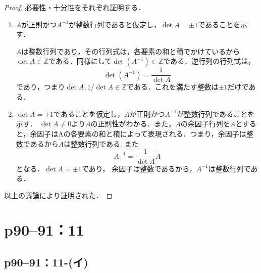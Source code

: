 \documentclass[a4paper,10pt,fleqn]{ltjsarticle}
\begin{document}
\begin{leftbar}
  \begin{proof}
    必要性・十分性をそれぞれ証明する．
    \begin{enumerate}
      \item $A$が正則かつ$A^{-1}$が整数行列であると仮定し，$\det A=\pm 1$であることを示す．

            $A$は整数行列であり，その行列式は，各要素の和と積でかけているから$\det A \in \mathbb{Z}$である．同様にして$\det (A^{-1}) \in \mathbb{Z}$である．逆行列の行列式は，
            \[
              \det (A^{-1})=\frac{1}{\det A}
            \]
            であり，つまり$\det A,1/\det A \in \mathbb{Z}$である．これを満たす整数は$\pm 1$だけである．
      \item $\det A=\pm 1$であることを仮定し，$A$が正則かつ$A^{-1}$が整数行列であることを示す．
            $\det A \neq 0$より$A$の正則性がわかる．また，$A$の余因子行列を$\tilde{A}$とすると，余因子はAの各要素の和と積によって表現される．つまり，余因子は整数であるから$\tilde{A}$は整数行列である. また
            \[
              A^{-1}=\frac{1}{\det A}\tilde{A}
            \]
            となる．$\det A=\pm 1$であり， 余因子は整数であるから，$A^{-1}$は整数行列である．
    \end{enumerate}
    以上の議論により証明された．
  \end{proof}
\end{leftbar}

\newpage

\section*{p90--91：11}

\subsection*{p90--91：11-(イ)}
\end{document}
